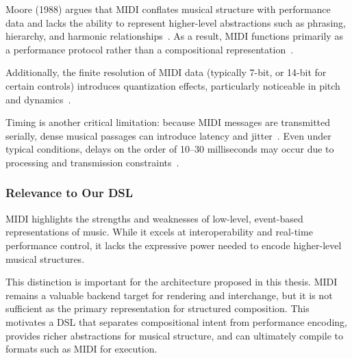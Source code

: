 Moore (1988) argues that MIDI conflates musical structure with performance data and lacks the ability to
represent higher-level abstractions such as phrasing, hierarchy, and harmonic relationships~\cite{Moore_1988}.
As a result, MIDI functions primarily as a performance protocol rather than a compositional
representation~\cite{Moore_1988}.

Additionally, the finite resolution of MIDI data (typically 7-bit, or 14-bit for certain controls) introduces
quantization effects, particularly noticeable in pitch and dynamics~\cite{Moore_1988}.

Timing is another critical limitation: because MIDI messages are transmitted serially, dense musical passages
can introduce latency and jitter~\cite{Moog_1986}.
Even under typical conditions, delays on the order of 10–30 milliseconds may occur due to processing and
transmission constraints~\cite{Moog_1986}.


\subsubsection{Relevance to Our DSL}

MIDI highlights the strengths and weaknesses of low-level, event-based representations of music.
While it excels at interoperability and real-time performance control, it lacks the expressive power needed
to encode higher-level musical structures.

This distinction is important for the architecture proposed in this thesis.
MIDI remains a valuable backend target for rendering and interchange, but it is not sufficient as the primary
representation for structured composition.
This motivates a DSL that separates compositional intent from performance encoding, provides richer abstractions for
musical structure, and can ultimately compile to formats such as MIDI for execution.

